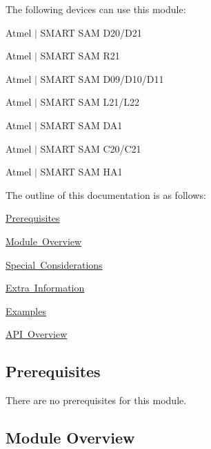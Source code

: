 The following devices can use this module\+:
\begin{DoxyItemize}
\item Atmel $\vert$ S\+M\+A\+RT S\+AM D20/\+D21
\item Atmel $\vert$ S\+M\+A\+RT S\+AM R21
\item Atmel $\vert$ S\+M\+A\+RT S\+AM D09/\+D10/\+D11
\item Atmel $\vert$ S\+M\+A\+RT S\+AM L21/\+L22
\item Atmel $\vert$ S\+M\+A\+RT S\+AM D\+A1
\item Atmel $\vert$ S\+M\+A\+RT S\+AM C20/\+C21
\item Atmel $\vert$ S\+M\+A\+RT S\+AM H\+A1
\end{DoxyItemize}

The outline of this documentation is as follows\+:
\begin{DoxyItemize}
\item \mbox{\hyperlink{group__asfdoc__sam0__extint__group_asfdoc_sam0_extint_prerequisites}{Prerequisites}}
\item \mbox{\hyperlink{group__asfdoc__sam0__extint__group_asfdoc_sam0_extint_module_overview}{Module Overview}}
\item \mbox{\hyperlink{group__asfdoc__sam0__extint__group_asfdoc_sam0_extint_special_considerations}{Special Considerations}}
\item \mbox{\hyperlink{group__asfdoc__sam0__extint__group_asfdoc_sam0_extint_extra_info}{Extra Information}}
\item \mbox{\hyperlink{group__asfdoc__sam0__extint__group_asfdoc_sam0_extint_examples}{Examples}}
\item \mbox{\hyperlink{group__asfdoc__sam0__extint__group_asfdoc_sam0_extint_api_overview}{A\+PI Overview}}
\end{DoxyItemize}\hypertarget{group__asfdoc__sam0__extint__group_asfdoc_sam0_extint_prerequisites}{}\subsection{Prerequisites}\label{group__asfdoc__sam0__extint__group_asfdoc_sam0_extint_prerequisites}
There are no prerequisites for this module.\hypertarget{group__asfdoc__sam0__extint__group_asfdoc_sam0_extint_module_overview}{}\subsection{Module Overview}\label{group__asfdoc__sam0__extint__group_asfdoc_sam0_extint_module_overview}
